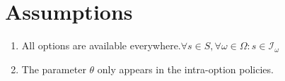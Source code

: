 \section*{Assumptions}

\begin{enumerate}[label=\textbf{A\arabic*}., leftmargin=*, ref={A\arabic*}]
    \item\label{asum:opt-all} All options are available everywhere.\@ \( \forall s \in S, \forall \omega \in \Omega: s \in \mathcal{I}_\omega \)
    \item\label{asum:theta-param} The parameter \( \theta \) only appears in the intra-option policies.
\end{enumerate}
